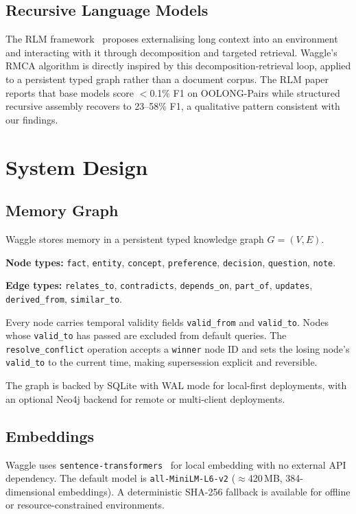 \documentclass[conference]{IEEEtran}
\begin{document}
\subsection{Recursive Language Models}

The RLM framework~\cite{zhang2026rlm} proposes externalising long context into an environment
and interacting with it through decomposition and targeted retrieval. Waggle's RMCA algorithm
is directly inspired by this decomposition-retrieval loop, applied to a persistent typed graph
rather than a document corpus. The RLM paper reports that base models score $<$0.1\% F1 on
OOLONG-Pairs while structured recursive assembly recovers to 23--58\% F1, a qualitative
pattern consistent with our findings.

\section{System Design}

\subsection{Memory Graph}

Waggle stores memory in a persistent typed knowledge graph $G = (V, E)$.

\textbf{Node types:} \texttt{fact}, \texttt{entity}, \texttt{concept}, \texttt{preference},
\texttt{decision}, \texttt{question}, \texttt{note}.

\textbf{Edge types:} \texttt{relates\_to}, \texttt{contradicts}, \texttt{depends\_on},
\texttt{part\_of}, \texttt{updates}, \texttt{derived\_from}, \texttt{similar\_to}.

Every node carries temporal validity fields \texttt{valid\_from} and \texttt{valid\_to}.
Nodes whose \texttt{valid\_to} has passed are excluded from default queries. The
\texttt{resolve\_conflict} operation accepts a \texttt{winner} node ID and sets the losing
node's \texttt{valid\_to} to the current time, making supersession explicit and reversible.

The graph is backed by SQLite with WAL mode for local-first deployments, with an optional
Neo4j backend for remote or multi-client deployments.

\subsection{Embeddings}

Waggle uses \texttt{sentence-transformers}~\cite{reimers2019sbert} for local embedding with
no external API dependency. The default model is \texttt{all-MiniLM-L6-v2} ($\approx$420\,MB,
384-dimensional embeddings). A deterministic SHA-256 fallback is available for offline or
resource-constrained environments.
\end{document}
